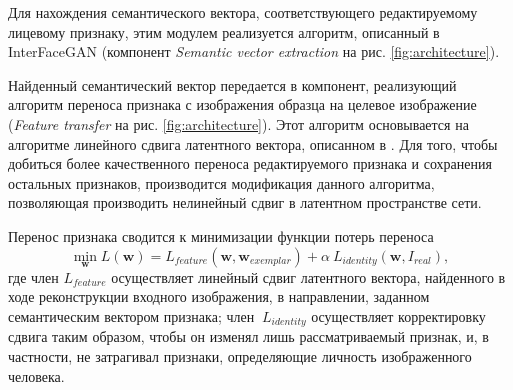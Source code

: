 \begin{enumerate}
Для нахождения семантического вектора, соответствующего редактируемому лицевому признаку, этим модулем реализуется алгоритм, описанный в InterFaceGAN \cite{shen2020interfacegan} (компонент \emph{Semantic vector extraction} на рис. \ref{fig:architecture}).

Найденный семантический вектор передается в компонент, реализующий алгоритм переноса признака с изображения образца на целевое изображение (\emph{Feature transfer} на рис. \ref{fig:architecture}).
Этот алгоритм основывается на алгоритме линейного сдвига латентного вектора, описанном в \cite{abdal2019image2stylegan}.
Для того, чтобы добиться более качественного переноса редактируемого признака и сохранения остальных признаков, производится модификация данного алгоритма, позволяющая производить нелинейный сдвиг в латентном пространстве сети.

Перенос признака сводится к минимизации функции потерь переноса
$$ 
\min_{\mathbf w} L(\mathbf w) = L_{feature}(\mathbf w, \mathbf w_{exemplar}) + \alpha~L_{identity}(\mathbf w, I_{real}),
$$
где член $L_{feature}$ осуществляет линейный сдвиг латентного вектора, найденного в ходе реконструкции входного изображения, в направлении, заданном семантическим вектором признака;  член $~L_{identity}$ осуществляет корректировку сдвига таким образом, чтобы он изменял лишь рассматриваемый признак, и, в частности, не затрагивал признаки, определяющие личность изображенного человека.

\end{enumerate}
